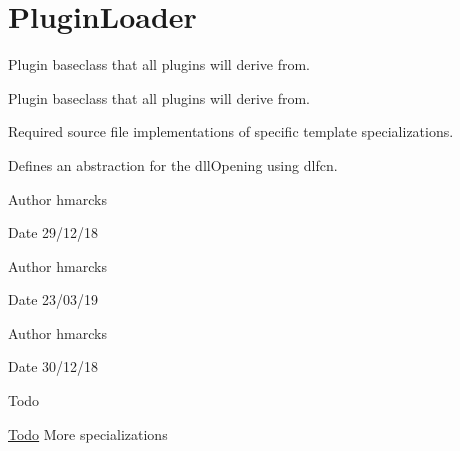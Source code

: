 \hypertarget{group__PluginLoader}{}\section{Plugin\+Loader}
\label{group__PluginLoader}


Plugin baseclass that all plugins will derive from.  


Plugin baseclass that all plugins will derive from. 

Required source file implementations of specific template specializations.

Defines an abstraction for the dll\+Opening using dlfcn.

\begin{DoxyAuthor}{Author}
hmarcks
\end{DoxyAuthor}
\begin{DoxyDate}{Date}
29/12/18
\end{DoxyDate}
\begin{DoxyAuthor}{Author}
hmarcks
\end{DoxyAuthor}
\begin{DoxyDate}{Date}
23/03/19
\end{DoxyDate}
\begin{DoxyAuthor}{Author}
hmarcks
\end{DoxyAuthor}
\begin{DoxyDate}{Date}
30/12/18 
\end{DoxyDate}
\begin{DoxyRefDesc}{Todo}
\item[\mbox{\hyperlink{todo__todo000020}{Todo}}]More specializations \end{DoxyRefDesc}
